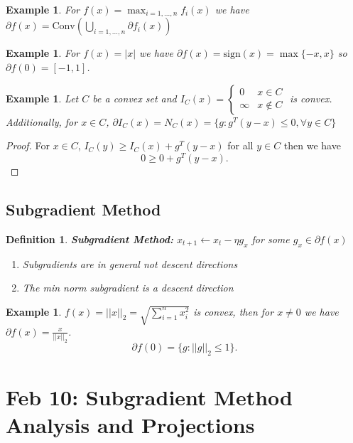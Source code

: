 \documentclass[a4paper]{article}
\newtheorem{defn}[thm]{Definition}
\newtheorem{eg}[thm]{Example}
\begin{document}
\begin{eg}
    For $f(x)=\max_{i=1,...,n}f_i(x)$ we have $\partial f(x)=\mathrm{Conv} \left(  \bigcup_{i=1,...,n} \partial f_i(x) \right)$
\end{eg}
\begin{eg}
    For $f(x)=|x|$ we have $\partial f(x)=\mathrm{sign}(x)=\max\{-x,x\}$ so $\partial f(0)=[-1,1]$. 
\end{eg}
\begin{eg}
    Let $C$ be a convex set and $I_C(x)=\begin{cases}
        0 & x\in C\\ 
        \infty & x\notin C
    \end{cases}$ is convex. \\
    Additionally, for $x\in C$, $\partial I_C(x)=N_C(x)= \{g: g^T(y-x)\leq 0,  \forall y\in C\}$
\end{eg}
\begin{proof}
    For $x\in C$, $I_C(y)\geq I_C(x)+g^T(y-x)$ for all $y\in C$ then we have \[
    0 \geq 0 + g^T(y-x)
    .\]
\end{proof}

\subsection{Subgradient Method}
\begin{defn}
    \textbf{Subgradient Method:} $x_{t+1}\leftarrow x_t-\eta g_x$ for some $g_x\in \partial f(x)$
    \begin{enumerate}
        \item Subgradients are in general not descent directions
        \item The min norm subgradient is a descent direction
    \end{enumerate}
\end{defn}
\begin{eg}
    $f(x)=||x||_2=\sqrt{\sum_{i=1}^n x_i^2}$ is convex, then for $x\neq 0$ we have $\partial f(x)=\frac{x}{||x||_2}$. \[
    \partial f(0)= \{ g: ||g||_2\leq 1\}
    .\] 
\end{eg}
\newpage
\section{Feb 10: Subgradient Method Analysis and Projections}
\end{document}
